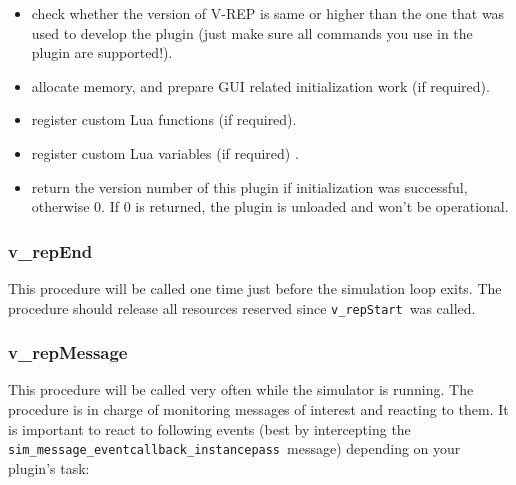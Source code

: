 \begin{itemize}[nosep]
\item check whether the version of V-REP is same or higher than the one that 
	was used to develop the plugin (just make sure all commands you use in the 
	plugin are supported!).
\item allocate memory, and prepare GUI related initialization work (if required).
\item register custom Lua functions (if required).
\item register custom Lua variables (if required) .
\item return the version number of this plugin if initialization was 
	successful, otherwise 0. If 0 is returned, the plugin is unloaded and 
	won't be operational.
\end{itemize}

\subsubsection{v\_repEnd}

This procedure will be called one time just before the simulation loop exits. 
The procedure should release all resources reserved since 
\verb|v_repStart|\ was called.

\subsubsection{v\_repMessage}

This procedure will be called very often while the simulator is running. The 
procedure is in charge of monitoring messages of interest and reacting to them. 
It is important to react to following events (best by intercepting the 
\verb|sim_message_eventcallback_instancepass|\ message) depending on your 
plugin's task:

